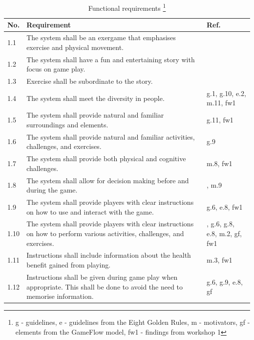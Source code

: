 \begin{minipage}{12 cm}
\begin{table} [H]
\centering
\begin{tabular}{|>{\raggedright}p{}|p{}|p{}|}
\hline
\textbf{No.} & \textbf{Requirement} &  \textbf{Ref.}\\ \hline
1.1 & The system shall be an exergame that emphasises exercise and physical movement. & \cite{project} \\ \hline
1.2 & The system shall have a fun and entertaining story with focus on game play.  & \cite{project} \cite{zyda2005visual} \\ \hline
1.3 & Exercise shall be subordinate to the story. & \cite{zyda2005visual} \\ \hline
1.4 & The system shall meet the diversity in people. & g.1, g.10, e.2, m.11, fw1 \\ \hline
1.5 & The system shall provide natural and familiar surroundings and elements. & g.11, fw1\\ \hline
1.6 & The system shall provide natural and familiar activities, challenges, and exercises. & g.9 \\ \hline
1.7 & The system shall provide both physical and cognitive challenges. & m.8, fw1 \\ \hline
1.8 & The system shall allow for decision making before and during the game. & \cite{understandingvg}, m.9 \\ \hline
1.9 & The system shall provide players with clear instructions on how to use and interact with the game. & g.6, e.8, fw1 \\ \hline
1.10 & The system shall provide players with clear instructions on how to perform various activities, challenges, and exercises. & \cite{project}, g.6, g.8, e.8, m.2, gf, fw1\\ \hline
1.11 & Instructions shall include information about the health benefit gained from playing. & m.3, fw1\\ \hline
1.12 & Instructions shall be given during game play when appropriate. This shall be done to avoid the need to memorise information. & g.6, g.9, e.8, gf \\ \hline
    \end{tabular}
    \caption[Functional requirements, part 1]{Functional requirements \footnote{g - guidelines, e - guidelines from the Eight Golden Rules, m - motivators, gf - elements from the GameFlow model, fw1 - findings from workshop 1}}
    \label{tab:func1}
\end{table} 
\end{minipage}

